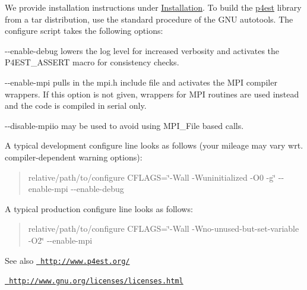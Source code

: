 We provide installation instructions under \mbox{\hyperlink{installing_p4est}{Installation}}. To build the \mbox{\hyperlink{structp4est}{p4est}} library from a tar distribution, use the standard procedure of the GNU autotools. The configure script takes the following options\+:


\begin{DoxyItemize}
\item {\ttfamily -\/-\/enable-\/debug} lowers the log level for increased verbosity and activates the {\ttfamily P4\+EST\+\_\+\+ASSERT} macro for consistency checks.
\item {\ttfamily -\/-\/enable-\/mpi} pulls in the mpi.\+h include file and activates the MPI compiler wrappers. If this option is not given, wrappers for MPI routines are used instead and the code is compiled in serial only.
\item {\ttfamily -\/-\/disable-\/mpiio} may be used to avoid using {\ttfamily MPI\+\_\+\+File} based calls.
\end{DoxyItemize}

A typical development configure line looks as follows (your mileage may vary wrt. compiler-\/dependent warning options)\+: \begin{quote}
{\ttfamily relative/path/to/configure CFLAGS=\char`\"{}-\/\+Wall -\/\+Wuninitialized -\/\+O0 -\/g\char`\"{} -\/-\/enable-\/mpi -\/-\/enable-\/debug} \end{quote}
A typical production configure line looks as follows\+: \begin{quote}
{\ttfamily relative/path/to/configure CFLAGS=\char`\"{}-\/\+Wall -\/\+Wno-\/unused-\/but-\/set-\/variable -\/\+O2\char`\"{} -\/-\/enable-\/mpi} \end{quote}
\begin{DoxySeeAlso}{See also}
\href{http://www.p4est.org/}{\texttt{ http\+://www.\+p4est.\+org/}} 

\href{http://www.gnu.org/licenses/licenses.html}{\texttt{ http\+://www.\+gnu.\+org/licenses/licenses.\+html}} 
\end{DoxySeeAlso}
